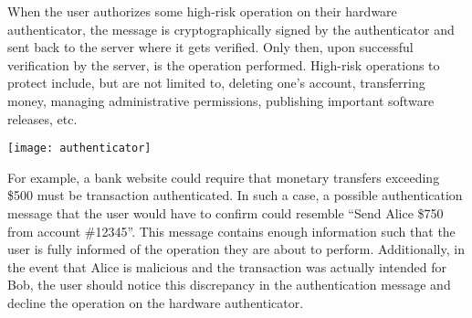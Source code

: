 When the user authorizes some high-risk operation on their hardware authenticator, the message is cryptographically signed by the authenticator and sent back to the server where it gets verified. Only then, upon successful verification by the server, is the operation performed. High-risk operations to protect include, but are not limited to, deleting one's account, transferring money, managing administrative permissions, publishing important software releases, etc. 

\begin{center}
\texttt{[image: authenticator]}
\end{center}

For example, a bank website could require that monetary transfers exceeding \$500 must be transaction authenticated. In such a case, a possible authentication message that the user would have to confirm could resemble ``Send Alice \$750 from account \#12345''. This message contains enough information such that the user is fully informed of the operation they are about to perform. Additionally, in the event that Alice is malicious and the transaction was actually intended for Bob, the user should notice this discrepancy in the authentication message and decline the operation on the hardware authenticator. 




